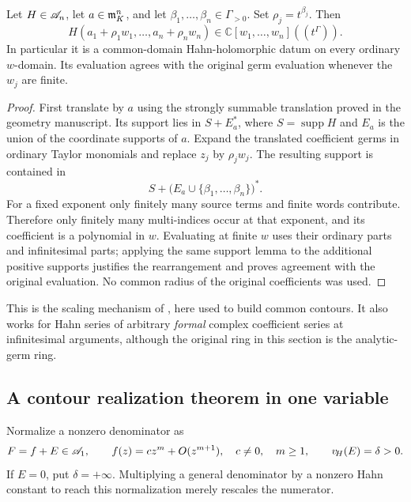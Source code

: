 \documentclass[11pt,letterpaper]{article}
\theoremstyle{definition}
\theoremstyle{remark}
\newcommand{\C}{\mathbb C}\newcommand{\R}{\mathbb R}\newcommand{\Q}{\mathbb Q}\newcommand{\Z}{\mathbb Z}\newcommand{\N}{\mathbb N}
\newcommand{\supp}{\operatorname{supp}}\newcommand{\red}{\operatorname{red}}\newcommand{\st}{\operatorname{st}}
\newcommand{\vH}{v_{\!H}}\newcommand{\re}{\operatorname{Re}}\newcommand{\im}{\operatorname{Im}}
\numberwithin{equation}{section}
\begin{document}
\begin{lemma}\label{lem:rescale}
Let $H\in\mathscr A_n$, let $a\in\mathfrak m_K^n$, and let $\beta_1,\ldots,\beta_n\in\Gamma_{>0}$. Set $\rho_j=t^{\beta_j}$. Then
\begin{equation}\label{eq:polynomialrescale}
 H(a_1+\rho_1 w_1,\ldots,a_n+\rho_n w_n)
       \in\C[w_1,\ldots,w_n]((t^\Gamma)).
\end{equation}
In particular it is a common-domain Hahn-holomorphic datum on every ordinary $w$-domain. Its evaluation agrees with the original germ evaluation whenever the $w_j$ are finite.
\end{lemma}
\begin{proof}
First translate by $a$ using the strongly summable translation proved in the geometry manuscript. Its support lies in $S+E_a^*$, where $S=\supp H$ and $E_a$ is the union of the coordinate supports of $a$. Expand the translated coefficient germs in ordinary Taylor monomials and replace $z_j$ by $\rho_j w_j$. The resulting support is contained in
\[
 S+\bigl(E_a\cup\{\beta_1,\ldots,\beta_n\}\bigr)^*.
\]
For a fixed exponent only finitely many source terms and finite words contribute. Therefore only finitely many multi-indices occur at that exponent, and its coefficient is a polynomial in $w$. Evaluating at finite $w$ uses their ordinary parts and infinitesimal parts; applying the same support lemma to the additional positive supports justifies the rearrangement and proves agreement with the original evaluation. No common radius of the original coefficients was used.
\end{proof}

This is the scaling mechanism of \cite[scaled Taylor polynomials lemma]{Geometry}, here used to build common contours. It also works for Hahn series of arbitrary \emph{formal} complex coefficient series at infinitesimal arguments, although the original ring in this section is the analytic-germ ring.

\subsection{A contour realization theorem in one variable}
Normalize a nonzero denominator as
\begin{equation}\label{eq:RFdenominator}
 F=f+E\in\A_1,\qquad
 f(z)=cz^m+O(z^{m+1}),\quad c\ne0,\quad m\ge1,
 \qquad \vH(E)=\delta>0.
\end{equation}
If $E=0$, put $\delta=+\infty$. Multiplying a general denominator by a nonzero Hahn constant to reach this normalization merely rescales the numerator.
\end{document}
